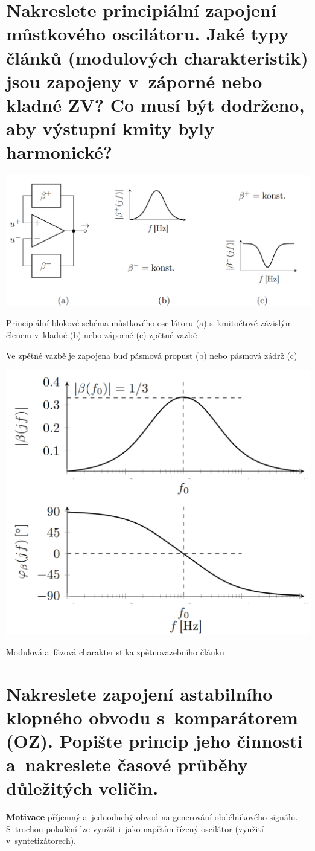 \documentclass[a4paper,12pt]{article}   %
\begin{document}
\newpage
\section{Nakreslete principiální zapojení můstkového oscilátoru. Jaké typy článků (modulových charakteristik) jsou zapojeny v~záporné nebo kladné ZV? Co musí být dodrženo, aby výstupní kmity byly harmonické?}
\begin{schema}[h!]
    \centering
    \includegraphics[width=.9\textwidth]{mustkovy-oscilator.PNG}
    \caption{Principiální blokové schéma můstkového oscilátoru (a) s~kmitočtově závislým členem v~kladné (b) nebo záporné (c) zpětné vazbě}
    \label{sch:mustkovy:oscilator}
\end{schema}

Ve zpětné vazbě je zapojena buď pásmová propust (b) nebo pásmová zádrž (c)

\begin{graf}[h!]
    \centering
    \includegraphics[width = .5\textwidth]{modulova-charakteristika-zv-clanku-oscilator.PNG}
    \caption{Modulová a~fázová charakteristika zpětnovazebního článku}
    \label{graf:osc:modul:charstka}
\end{graf}







\section{Nakreslete zapojení astabilního klopného obvodu s~komparátorem (OZ). Popište princip jeho činnosti a~nakreslete časové průběhy důležitých veličin.}
\textbf{Motivace} příjemný a~jednoduchý obvod na generování obdélníkového signálu. S~trochou poladění lze využít i~jako napětím řízený oscilátor (využití v~syntetizátorech).
\end{document}
